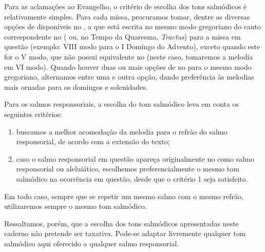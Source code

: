 Para as aclamações ao Evangelho, o critério de escolha dos tons salmódicos é relativamente simples. Para cada missa, procuramos tomar, dentre as diversas opções de {\Al} disponíveis no {\GS}, a que está escrita no mesmo modo gregoriano do canto correspondente no {\GR} ({\Al} ou, no Tempo da Quaresma, \emph{Tractus}) para a missa em questão (exemplo: VIII modo para o I Domingo do Advento), exceto quando este for o V modo, que não possui equivalente no {\GS} (neste caso, tomaremos a melodia em VI modo). Quando houver duas ou mais opções de {\Al} no {\GS} para o mesmo modo gregoriano, alternamos entre uma e outra opção, dando preferência às melodias mais ornadas para os domingos e solenidades.

Para os salmos responsoriais, a escolha do tom salmódico leva em conta os seguintes critérios:
\begin{enumerate}
    \item buscamos a melhor acomodação da melodia para o refrão do salmo responsorial, de acordo com a extensão do texto;
    \item caso o salmo responsorial em questão apareça originalmente no {\GS} como salmo responsorial ou aleluiático, escolhemos preferencialmente o mesmo tom salmódico na ocorrência em questão, desde que o critério 1 seja satisfeito.
\end{enumerate}
Em todo caso, sempre que se repetir um mesmo salmo com o mesmo refrão, utilizaremos sempre o mesmo tom salmódico.

Ressaltamos, porém, que a escolha dos tons salmódicos apresentadas neste caderno não pretende ser taxativa. Pode-se adaptar livremente qualquer tom salmódico aqui oferecido a qualquer salmo responsorial.